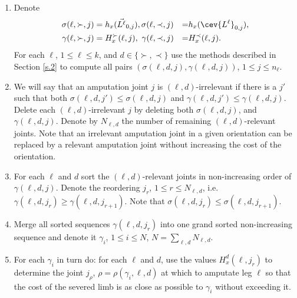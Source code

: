 \begin{enumerate}
	\item Denote 
	\begin{alignat}{3}
	\sigma(\ell,\succ,j)&=h_x(\vec{L^{\ell}}_{0, j}),\sigma(\ell,\prec,j)&=&h_x(\cev{L^{\ell}}_{0, j}),\\
	\gamma(\ell,\succ,j)&=H^{\succ}_x(\ell,j),\ \gamma(\ell,\prec,j)&=&H^{\prec}_x(\ell,j).
	\end{alignat}
	For each $\ell$, $1\leq \ell\leq k$, and $d \in \{\succ,\prec\}$ 
	use the methods described in Section \ref{s.2} to compute all 
	 pairs $(\sigma(\ell,d,j), \gamma(\ell,d,j))$, $1\leq j \leq n_\ell$.
	\item We will say that an amputation joint $j$ is $(\ell,d)$-irrelevant if there is a $j'$ such that both 
	$\sigma(\ell,d,j')\leq \sigma(\ell,d,j)$ and $\gamma(\ell,d,j') \leq \gamma(\ell,d,j)$.
	Delete each $(\ell,d)$-irrelevant $j$ by deleting both $\sigma(\ell,d,j)$, 
	and $\gamma(\ell,d,j)$. Denote by $N_{\ell,d}$ the number of remaining 
	$(\ell,d)$-relevant joints. Note that an irrelevant amputation joint in a given orientation 
	can be replaced by a relevant amputation joint without increasing the cost of the orientation.
	\item For each $\ell$ and $d$ sort the $(\ell,d)$-relevant joints in non-increasing order
	of $\gamma(\ell,d,j)$. Denote the reordering $j_r$, $1\leq r \leq N_{\ell,d}$,
	i.e. $\gamma(\ell,d,j_r)\geq \gamma(\ell,d,j_{r+1})$. Note that 
	$\sigma(\ell,d,j_r)\leq \sigma(\ell,d,j_{r+1})$.
	\item Merge all sorted sequences $\gamma(\ell,d,j_r)$ into one grand sorted 
	non-increasing sequence
	and denote it $\gamma_i$, $1\leq i \leq N$, $N=\sum_{\ell, d} N_{\ell, d}$.
	\item For each $\gamma_i$ in turn do: 
 for each $\ell$ and $d$, 
 use the values $H^{d}_x(\ell,j_r)$ to determine the joint 
		$j_\rho$, $\rho=\rho(\gamma_i,\ell,d)$ at which to amputate leg $\ell$ so that the cost of the severed limb
	is as close as possible to $\gamma_i$ without exceeding it. 
\end{enumerate}

